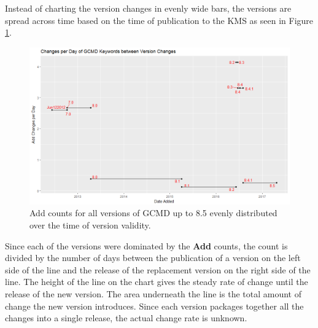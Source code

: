 Instead of charting the version changes in evenly wide bars, the versions are spread across time based on the time of publication to the KMS as seen in Figure \ref{GCMDPlot1}.
\begin{figure}%
	\centering
	\includegraphics[scale=0.56]{figures/GCMDPlot1.png}
	\caption[Global Change Master Direcotry counts distributed over time.]{Add counts for all versions of GCMD up to 8.5 evenly distributed over the time of version validity.}
	\label{GCMDPlot1}
\end{figure}
Since each of the versions were dominated by the \textbf{Add} counts, the count is divided by the number of days between the publication of a version on the left side of the line and the release of the replacement version on the right side of the line.
The height of the line on the chart gives the steady rate of change until the release of the new version.
The area underneath the line is the total amount of change the new version introduces.
Since each version packages together all the changes into a single release, the actual change rate is unknown.

